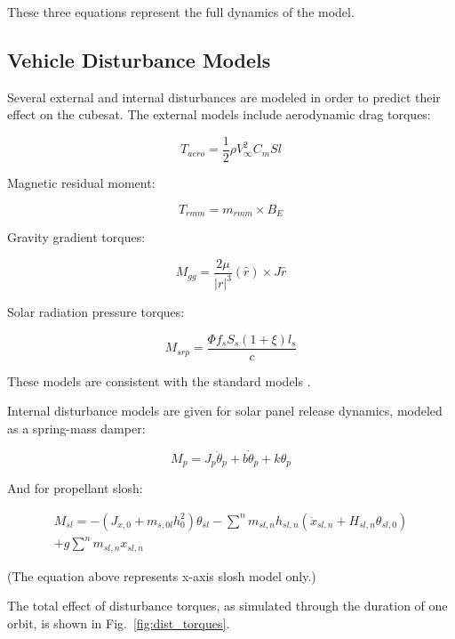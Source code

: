 \documentclass[letterpaper, 11 pt, conference]{ieeeconf}  %
\begin{document}
These three equations represent the full dynamics of the model.

\subsection{Vehicle Disturbance Models}

Several external and internal disturbances are modeled in order to predict their effect on the cubesat. The external models include aerodynamic drag torques:

\[
T_{aero} = \frac{1}{2} \rho V_{\infty}^{2} C_{m} Sl
\]

Magnetic residual moment:

\[
T_{rmm} = m_{rmm} \times B_{E}
\]

Gravity gradient torques:

\[
M_{gg} = \frac{2\mu}{|r|^{3}} (\hat{r}) \times J\hat{r}
\]

Solar radiation pressure torques:

\[
M_{srp} = \frac{\Phi f_{s} S_{s} (1+\xi)l_{s}}{c}
\]

These models are consistent with the standard models \cite{smad}.

Internal disturbance models are given for solar panel release dynamics, modeled as a spring-mass damper:

\[
M_{p} = J_{p} \ddot{\theta}_{p} + b \dot{\theta}_{p} + k \theta_{p}
\]

And for propellant slosh:

\begin{multline*}
M_{sl} = -(J_{x,0} + m_{s,0l} h_{0}^{2})\theta_{sl} - \sum^{n} m_{sl,n} h_{sl,n} (\ddot{x}_{sl,n} + H_{sl,n} \theta_{sl,0}) \\
+ g \sum^{n} m_{sl,n} x_{sl,n}
\end{multline*}

(The equation above represents x-axis slosh model only.)

The total effect of disturbance torques, as simulated through the duration of one orbit, is shown in Fig.~\ref{fig:dist_torques}.
\end{document}
